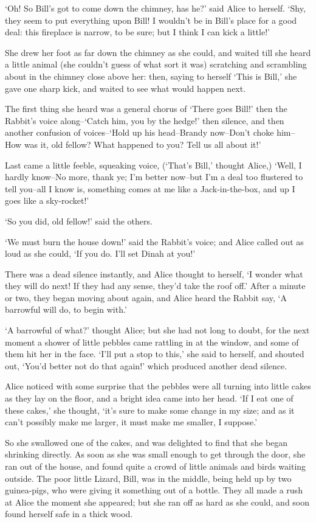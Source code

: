 \documentclass[statementpaper,twoside,openany]{memoir}
\begin{document}
`Oh! So Bill's got to come down the chimney, has he?' said Alice to herself. `Shy, they seem to put everything upon Bill! I wouldn't be in Bill's place for a good deal: this fireplace is narrow, to be sure; but I think I can kick a little!'

She drew her foot as far down the chimney as she could, and waited till she heard a little animal (she couldn't guess of what sort it was) scratching and scrambling about in the chimney close above her: then, saying to herself `This is Bill,' she gave one sharp kick, and waited to see what would happen next.

The first thing she heard was a general chorus of `There goes Bill!' then the Rabbit's voice along--`Catch him, you by the hedge!' then silence, and then another confusion of voices--`Hold up his head--Brandy now--Don't choke him--How was it, old fellow? What happened to you? Tell us all about it!'

Last came a little feeble, squeaking voice, (`That's Bill,' thought Alice,) `Well, I hardly know--No more, thank ye; I'm better now--but I'm a deal too flustered to tell you--all I know is, something comes at me like a Jack-in-the-box, and up I goes like a sky-rocket!'

`So you did, old fellow!' said the others.

`We must burn the house down!' said the Rabbit's voice; and Alice called out as loud as she could, `If you do. I'll set Dinah at you!'

There was a dead silence instantly, and Alice thought to herself, `I wonder what they will do next! If they had any sense, they'd take the roof off.' After a minute or two, they began moving about again, and Alice heard the Rabbit say, `A barrowful will do, to begin with.'

`A barrowful of what?' thought Alice; but she had not long to doubt, for the next moment a shower of little pebbles came rattling in at the window, and some of them hit her in the face. `I'll put a stop to this,' she said to herself, and shouted out, `You'd better not do that again!' which produced another dead silence.

Alice noticed with some surprise that the pebbles were all turning into little cakes as they lay on the floor, and a bright idea came into her head. `If I eat one of these cakes,' she thought, `it's sure to make some change in my size; and as it can't possibly make me larger, it must make me smaller, I suppose.'

So she swallowed one of the cakes, and was delighted to find that she began shrinking directly. As soon as she was small enough to get through the door, she ran out of the house, and found quite a crowd of little animals and birds waiting outside. The poor little Lizard, Bill, was in the middle, being held up by two guinea-pigs, who were giving it something out of a bottle. They all made a rush at Alice the moment she appeared; but she ran off as hard as she could, and soon found herself safe in a thick wood.
\end{document}
